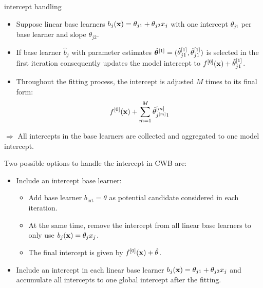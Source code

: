 \documentclass[11pt,compress,t,notes=noshow, xcolor=table]{beamer}
\begin{document}
\begin{vbframe}{intercept handling}

\begin{itemize}
  \item Suppose linear base learners $b_j(\mathbf{x}) = \theta_{j1} + \theta_{j2} x_j$ with one intercept $\theta_{j1}$ per base learner and slope $\theta_{j2}$.
  \item If base learner $\hat{b}_j$ with parameter estimates $\hat{\bm{\theta}}^{[1]} = (\hat{\theta}_{j1}^{[1]}, \hat{\theta}_{j1}^{[1]})$ is selected in the first iteration consequently updates the model intercept to $f^{[0]}(\mathbf{x}) + \hat{\theta}_{j1}^{[1]}$.
  \item Throughout the fitting process, the intercept is adjusted $M$ times to its final form:
    $$
    f^{[0]}(\mathbf{x}) + \sum\limits_{m=1}^M \hat{\theta}^{[m]}_{j^{[m]}1}
    $$
\end{itemize}
$\Rightarrow$ All intercepts in the base learners are collected and aggregated to one model intercept.

\framebreak

Two possible options to handle the intercept in CWB are:

\begin{itemize}

\item Include an intercept base learner:
  \begin{itemize}
    \item Add base learner $b_{\text{int}} = \theta$ as potential candidate considered in each iteration.
    \item At the same time, remove the intercept from all linear base learners to only use $b_j(\mathbf{x}) = \theta_j x_j$.
    \item The final intercept is given by $f^{[0]}(\mathbf{x}) + \hat{\theta}$.
  \end{itemize}
  \item Include an intercept in each linear base learner $b_j(\mathbf{x}) = \theta_{j1} + \theta_{j2} x_j$ and accumulate all intercepts to one global intercept after the fitting.

\end{itemize}


\end{vbframe}
\end{document}
